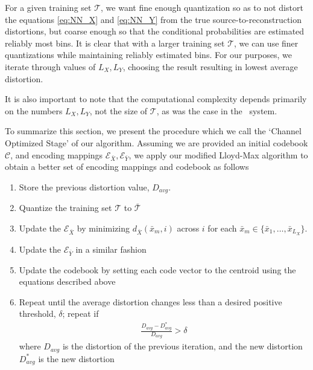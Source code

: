 For a given training set $\mathcal T$, we want fine enough quantization so as to not distort the equations \eqref{eq:NN_X} and \eqref{eq:NN_Y} from the true source-to-reconstruction distortions, but coarse enough so that the conditional probabilities are estimated reliably most bins. It is clear that with a larger training set $\mathcal T$, we can use finer quantizations while maintaining reliably estimated bins. For our purposes, we iterate through values of $L_X, L_Y$, choosing the result resulting in lowest average distortion.

It is also important to note that the computational complexity depends primarily on the numbers $L_X, L_Y$, not the size of $\mathcal T$, as was the case in the \sysII\ system.

To summarize this section, we present the procedure which we call the `Channel Optimized Stage' of our algorithm. Assuming we are provided an initial codebook $\mathcal{C}$, and encoding mappings $\mathcal E_{\bar X}, \mathcal E_{\bar Y}$, we apply our modified Lloyd-Max algorithm to obtain a better set of encoding mappings and codebook as follows

\begin{enumerate}
    \item Store the previous distortion value, $D_{avg}$.
    \item Quantize the training set $\mathcal T$ to $\mathcal{\bar T}$
    \item Update the $\mathcal{E}_{\bar X}$ by minimizing $d_{\bar X}(\bar x_m,i)$ across $i$ for each $\bar x_m \in \{\bar x_1,\ldots,\bar x_{L_X}\}$.
    \item Update the $\mathcal{E}_{\bar Y}$ in a similar fashion
    \item Update the codebook by setting each code vector to the centroid using the equations described above
    \item Repeat until the average distortion changes less than a desired positive threshold, $\delta$; repeat if
    \begin{align}
        \frac
        {D_{avg} - D^*_{avg}}
        {D_{avg}}
        > \delta
    \end{align}
    where $D_{avg}$ is the distortion of the previous iteration, and the new distortion $D^*_{avg}$ is the new distortion
\end{enumerate}

